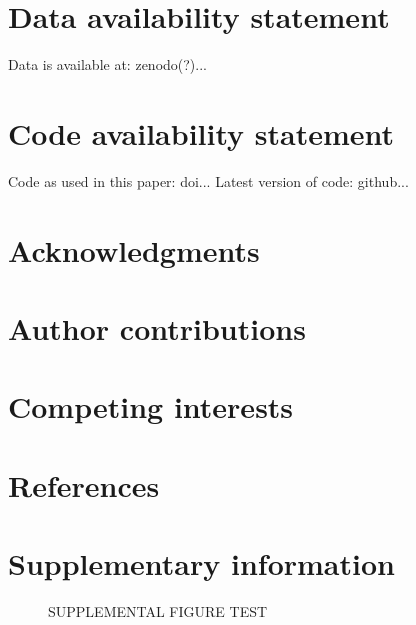 \documentclass[12pt]{article}
\newcommand{\beginsupplement}{%
        \setcounter{table}{0}
        \renewcommand{\thetable}{S\arabic{table}}%
        \setcounter{figure}{0}
        \renewcommand{\thefigure}{S\arabic{figure}}%
     }
\begin{document}
\section{Data availability statement}

Data is available at: zenodo(?)...

\section{Code availability statement}

Code as used in this paper: doi...
Latest version of code: github...

\section{Acknowledgments}

\section{Author contributions}




\section{Competing interests}

\section{References}




\section{Supplementary information}
\beginsupplement

\begin{figure}

\caption{SUPPLEMENTAL FIGURE TEST} 
\label{fig:suppTest}
\end{figure}
\end{document}
